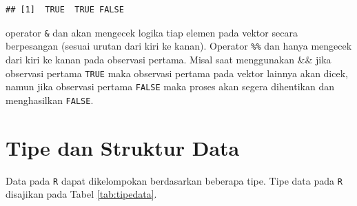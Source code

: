 \documentclass[12pt,]{krantz}
\begin{document}
\begin{verbatim}
## [1]  TRUE  TRUE FALSE
\end{verbatim}

operator \texttt{\&} dan \texttt{\textbar{}} akan mengecek logika tiap elemen pada vektor secara berpesangan (sesuai urutan dari kiri ke kanan). Operator \texttt{\%\%} dan \texttt{\textbar{}\textbar{}} hanya mengecek dari kiri ke kanan pada observasi pertama. Misal saat menggunakan \&\& jika observasi pertama \texttt{TRUE} maka observasi pertama pada vektor lainnya akan dicek, namun jika observasi pertama \texttt{FALSE} maka proses akan segera dihentikan dan menghasilkan \texttt{FALSE}.

\hypertarget{tipe-dan-struktur-data}{%
\section{Tipe dan Struktur Data}\label{tipe-dan-struktur-data}}

Data pada \texttt{R} dapat dikelompokan berdasarkan beberapa tipe. Tipe data pada \texttt{R} disajikan pada Tabel \ref{tab:tipedata}.
\end{document}
